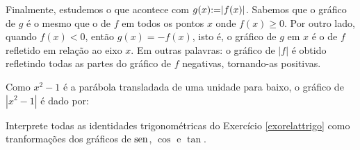 Finalmente, estudemos o que acontece com $g(x){:=} |f(x)|$. 
Sabemos que o gráfico de $g$ é o mesmo que o de $f$ em todos os pontos $x$ onde $f(x)\geq
0$. Por outro lado, quando $f(x)<0$, então $g(x)=-f(x)$, isto é, o gráfico de $g$ em $x$ é
o de $f$ refletido em relação ao eixo $x$. Em outras palavras: o gráfico 
de $|f|$ é obtido
refletindo todas as partes do gráfico de $f$ negativas, tornando-as 
positivas.
\begin{ex}\label{Ex:modulodografico}
Como $x^2-1$ é a parábola transladada de uma unidade para baixo, o gráfico de $|x^2-1|$ é dado por:
\begin{center}
\begin{bmlimage}\end{bmlimage}
\end{center}
\end{ex}

\begin{exo}
 Interprete todas as identidades trigonométricas do
Exercício \ref{exorelattrigo} como tranformações dos gráficos de $\operatorname{sen}$, $\cos$ e $\tan$.
\end{exo}

